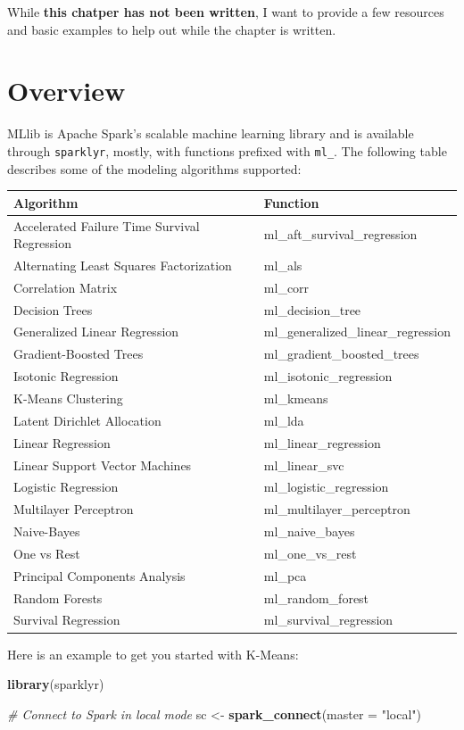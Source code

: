 \documentclass[]{book}
\newenvironment{Shaded}{\begin{snugshade}}{\end{snugshade}}
\newcommand{\CommentTok}[1]{\textcolor[rgb]{0.56,0.35,0.01}{\textit{#1}}}
\newcommand{\DataTypeTok}[1]{\textcolor[rgb]{0.13,0.29,0.53}{#1}}
\newcommand{\KeywordTok}[1]{\textcolor[rgb]{0.13,0.29,0.53}{\textbf{#1}}}
\newcommand{\NormalTok}[1]{#1}
\newcommand{\StringTok}[1]{\textcolor[rgb]{0.31,0.60,0.02}{#1}}
\theoremstyle{definition}
\theoremstyle{definition}
\theoremstyle{definition}
\theoremstyle{remark}
\begin{document}
While \textbf{this chatper has not been written}, I want to provide a
few resources and basic examples to help out while the chapter is
written.

\hypertarget{overview}{%
\section{Overview}\label{overview}}

MLlib is Apache Spark's scalable machine learning library and is
available through \texttt{sparklyr}, mostly, with functions prefixed
with \texttt{ml\_}. The following table describes some of the modeling
algorithms supported:

\begin{longtable}[]{@{}ll@{}}
\toprule
Algorithm & Function\tabularnewline
\midrule
\endhead
Accelerated Failure Time Survival Regression &
ml\_aft\_survival\_regression\tabularnewline
Alternating Least Squares Factorization & ml\_als\tabularnewline
Correlation Matrix & ml\_corr\tabularnewline
Decision Trees & ml\_decision\_tree\tabularnewline
Generalized Linear Regression &
ml\_generalized\_linear\_regression\tabularnewline
Gradient-Boosted Trees & ml\_gradient\_boosted\_trees\tabularnewline
Isotonic Regression & ml\_isotonic\_regression\tabularnewline
K-Means Clustering & ml\_kmeans\tabularnewline
Latent Dirichlet Allocation & ml\_lda\tabularnewline
Linear Regression & ml\_linear\_regression\tabularnewline
Linear Support Vector Machines & ml\_linear\_svc\tabularnewline
Logistic Regression & ml\_logistic\_regression\tabularnewline
Multilayer Perceptron & ml\_multilayer\_perceptron\tabularnewline
Naive-Bayes & ml\_naive\_bayes\tabularnewline
One vs Rest & ml\_one\_vs\_rest\tabularnewline
Principal Components Analysis & ml\_pca\tabularnewline
Random Forests & ml\_random\_forest\tabularnewline
Survival Regression & ml\_survival\_regression\tabularnewline
\bottomrule
\end{longtable}

Here is an example to get you started with K-Means:

\begin{Shaded}
\begin{Highlighting}[]
\KeywordTok{library}\NormalTok{(sparklyr)}

\CommentTok{# Connect to Spark in local mode}
\NormalTok{sc <-}\StringTok{ }\KeywordTok{spark_connect}\NormalTok{(}\DataTypeTok{master =} \StringTok{"local"}\NormalTok{)}
\end{Highlighting}
\end{Shaded}
\end{document}
